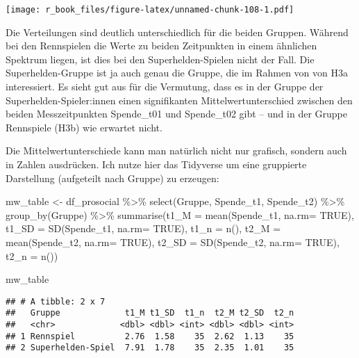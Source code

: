 \documentclass[
]{book}
\newenvironment{Shaded}{\begin{snugshade}}{\end{snugshade}}
\newcommand{\AttributeTok}[1]{\textcolor[rgb]{0.77,0.63,0.00}{#1}}
\newcommand{\ConstantTok}[1]{\textcolor[rgb]{0.00,0.00,0.00}{#1}}
\newcommand{\FunctionTok}[1]{\textcolor[rgb]{0.00,0.00,0.00}{#1}}
\newcommand{\NormalTok}[1]{#1}
\newcommand{\OtherTok}[1]{\textcolor[rgb]{0.56,0.35,0.01}{#1}}
\newcommand{\SpecialCharTok}[1]{\textcolor[rgb]{0.00,0.00,0.00}{#1}}
\begin{document}
\texttt{[image: r\_book\_files/figure-latex/unnamed-chunk-108-1.pdf]}

Die Verteilungen sind deutlich unterschiedlich für die beiden Gruppen. Während bei den Rennspielen die Werte zu beiden Zeitpunkten in einem ähnlichen Spektrum liegen, ist dies bei den Superhelden-Spielen nicht der Fall. Die Superhelden-Gruppe ist ja auch genau die Gruppe, die im Rahmen von von H3a interessiert. Es sieht gut aus für die Vermutung, dass es in der Gruppe der Superhelden-Spieler:innen einen signifikanten Mittelwertunterschied zwischen den beiden Messzeitpunkten Spende\_t01 und Spende\_t02 gibt -- und in der Gruppe Rennspiele (H3b) wie erwartet nicht.

Die Mittelwertunterschiede kann man natürlich nicht nur grafisch, sondern auch in Zahlen ausdrücken. Ich nutze hier das Tidyverse um eine gruppierte Darstellung (aufgeteilt nach Gruppe) zu erzeugen:

\begin{Shaded}
\begin{Highlighting}[]
\NormalTok{mw\_table }\OtherTok{\textless{}{-}}\NormalTok{ df\_prosocial }\SpecialCharTok{\%\textgreater{}\%} 
  \FunctionTok{select}\NormalTok{(Gruppe, Spende\_t1, Spende\_t2) }\SpecialCharTok{\%\textgreater{}\%} 
  \FunctionTok{group\_by}\NormalTok{(Gruppe) }\SpecialCharTok{\%\textgreater{}\%} 
  \FunctionTok{summarise}\NormalTok{(}\AttributeTok{t1\_M =} \FunctionTok{mean}\NormalTok{(Spende\_t1, }\AttributeTok{na.rm=} \ConstantTok{TRUE}\NormalTok{),}
            \AttributeTok{t1\_SD =} \FunctionTok{SD}\NormalTok{(Spende\_t1, }\AttributeTok{na.rm=} \ConstantTok{TRUE}\NormalTok{),}
            \AttributeTok{t1\_n =} \FunctionTok{n}\NormalTok{(),}
            \AttributeTok{t2\_M =} \FunctionTok{mean}\NormalTok{(Spende\_t2, }\AttributeTok{na.rm=} \ConstantTok{TRUE}\NormalTok{),}
            \AttributeTok{t2\_SD =} \FunctionTok{SD}\NormalTok{(Spende\_t2, }\AttributeTok{na.rm=} \ConstantTok{TRUE}\NormalTok{),}
            \AttributeTok{t2\_n =} \FunctionTok{n}\NormalTok{())}

\NormalTok{mw\_table}
\end{Highlighting}
\end{Shaded}

\begin{verbatim}
## # A tibble: 2 x 7
##   Gruppe             t1_M t1_SD  t1_n  t2_M t2_SD  t2_n
##   <chr>             <dbl> <dbl> <int> <dbl> <dbl> <int>
## 1 Rennspiel          2.76  1.58    35  2.62  1.13    35
## 2 Superhelden-Spiel  7.91  1.78    35  2.35  1.01    35
\end{verbatim}
\end{document}
